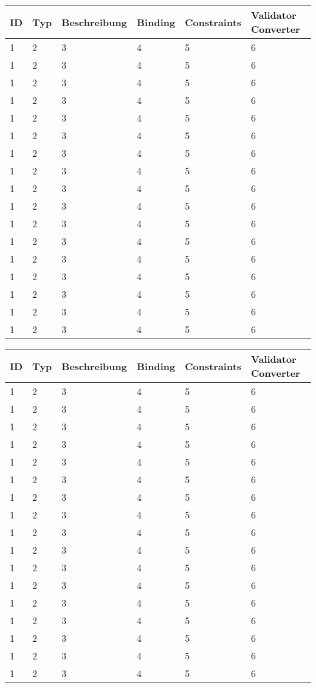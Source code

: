 \newcommand{\ftable}[1]{\begin{sidewaystable}
\begin{tabular}[H]{ m{2cm} m{3cm} m{6cm} m{2.5cm} m{2cm} m{2cm} }
    \toprule
    \textbf{ID} & \textbf{Typ} & \textbf{Beschreibung} & \textbf{Binding} & \textbf{Constraints} & \textbf{Validator \newline Converter} \\
    \midrule
    #1
    \bottomrule
\end{tabular}
\end{sidewaystable}
}

\newcommand{\fentry}[6]{#1 & #2 & #3 & #4 & #5 & #6\\}

\ftable{
    \fentry{1}{2}{3}{4}{5}{6}
    \fentry{1}{2}{3}{4}{5}{6}
    \fentry{1}{2}{3}{4}{5}{6}
    \fentry{1}{2}{3}{4}{5}{6}
    \fentry{1}{2}{3}{4}{5}{6}
    \fentry{1}{2}{3}{4}{5}{6}
    \fentry{1}{2}{3}{4}{5}{6}
    \fentry{1}{2}{3}{4}{5}{6}
    \fentry{1}{2}{3}{4}{5}{6}
    \fentry{1}{2}{3}{4}{5}{6}
    \fentry{1}{2}{3}{4}{5}{6}
    \fentry{1}{2}{3}{4}{5}{6}
    \fentry{1}{2}{3}{4}{5}{6}
    \fentry{1}{2}{3}{4}{5}{6}
    \fentry{1}{2}{3}{4}{5}{6}
    \fentry{1}{2}{3}{4}{5}{6}
    \fentry{1}{2}{3}{4}{5}{6}
}

\ftable{
    \fentry{1}{2}{3}{4}{5}{6}
    \fentry{1}{2}{3}{4}{5}{6}
    \fentry{1}{2}{3}{4}{5}{6}
    \fentry{1}{2}{3}{4}{5}{6}
    \fentry{1}{2}{3}{4}{5}{6}
    \fentry{1}{2}{3}{4}{5}{6}
    \fentry{1}{2}{3}{4}{5}{6}
    \fentry{1}{2}{3}{4}{5}{6}
    \fentry{1}{2}{3}{4}{5}{6}
    \fentry{1}{2}{3}{4}{5}{6}
    \fentry{1}{2}{3}{4}{5}{6}
    \fentry{1}{2}{3}{4}{5}{6}
    \fentry{1}{2}{3}{4}{5}{6}
    \fentry{1}{2}{3}{4}{5}{6}
    \fentry{1}{2}{3}{4}{5}{6}
    \fentry{1}{2}{3}{4}{5}{6}
    \fentry{1}{2}{3}{4}{5}{6}
}